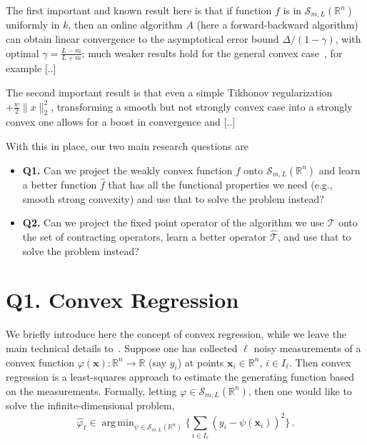 \documentclass{article}
\DeclareMathOperator*{\argmin}{arg\,min}
\newcommand{\R}{\mathbb{R}}
\newcommand{\x}{\mathbold{x}}
\begin{document}
The first important and known result here is that if function $f$ is in $\mathcal{S}_{m,L}(\R^n)$ uniformly in $k$, then an online algorithm $A$ (here a forward-backward algorithm) can obtain linear convergence to the asymptotical error bound $\Delta/(1-\gamma)$, with optimal $\gamma = \frac{L-m}{L+m}$; much weaker results hold for the general convex case~\cite{Simonetto20XX}, for example [..]

The second important result is that even a simple Tikhonov regularization $+ \frac{w}{2} \|x\|^2_2$, transforming a smooth but not strongly convex case into a strongly convex one allows for a boost in convergence and [..]


With this in place, our two main research questions are
\begin{itemize}
\item {\bf Q1.} Can we project the weakly convex function $f$ onto $\mathcal{S}_{m,L}(\R^n)$ and learn a better function $\hat{f}$ that has all the functional properties we need (e.g., smooth strong convexity) and use that to solve the problem instead?

\item {\bf Q2.} Can we project the fixed point operator of the algorithm we use $\mathcal{T}$ onto the set of contracting operators, learn a better operator $\hat{\mathcal{T}}$, and use that to solve the problem instead?

\end{itemize}

\section{Q1. Convex Regression}

We briefly introduce here the concept of convex regression, while we leave the main technical details to~\cite{Mazumder2019,simonetto_smooth_2021}. Suppose one has collected $\ell$ noisy measurements of a convex function $\varphi(\x): \R^n \to \R$ (say $y_i$) at points $\x_i \in \R^n$, $i \in I_{\ell}$. Then convex regression is a least-squares approach to estimate the generating function based on the measurements. Formally, letting $\varphi \in \mathcal{S}_{m,L}(\R^n)$, then one would like to solve the infinite-dimensional problem, 
\begin{equation}\label{eq.inf}
\hat{\varphi}_{\ell} \in \argmin_{\psi \in \mathcal{S}_{m, L}(\R^n)}\Big\{ \sum_{i\in I_{\ell}} (y_i - \psi(\x_i))^2 \Big\} \,.
\end{equation}
\end{document}

